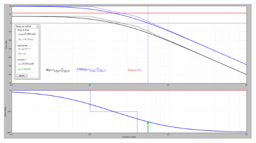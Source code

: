 \documentclass[10pt,fleqn]{article} %
\begin{document}
\begin{center}
\includegraphics[width=\linewidth]{images/cor_04}
\end{center}
\end{document}
